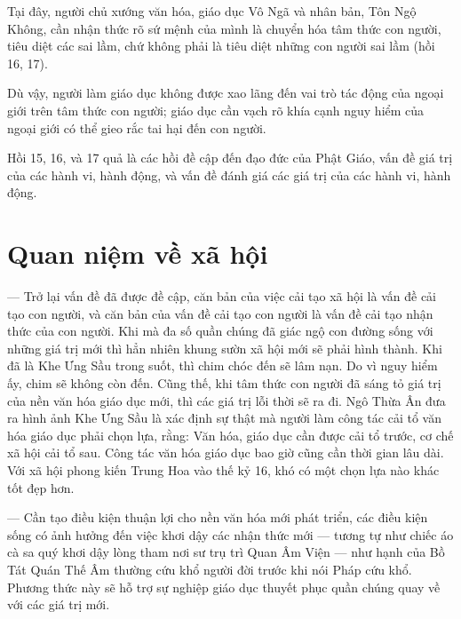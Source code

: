 Tại đây, người chủ xướng văn hóa, giáo dục Vô Ngã và nhân bản, Tôn Ngộ Không, cần nhận thức rõ sứ mệnh của mình là chuyển hóa tâm thức con người, tiêu diệt các sai lầm, chứ không phải là tiêu diệt những con người sai lầm (hồi 16, 17).

Dù vậy, người làm giáo dục không được xao lãng đến vai trò tác động của ngoại giới trên tâm thức con người; giáo dục cần vạch rõ khía cạnh nguy hiểm của ngoại giới có thể gieo rắc tai hại đến con người.

Hồi 15, 16, và 17 quả là các hồi đề cập đến đạo đức của Phật Giáo, vấn đề giá trị của các hành vi, hành động, và vấn đề đánh giá các giá trị của các hành vi, hành động.

\section{Quan niệm về xã hội} %
\label{sec:15_xa_hoi}

— Trở lại vấn đề đã được đề cập, căn bản của việc cải tạo xã hội là vấn đề cải tạo con người, và căn bản của vấn đề cải tạo con người là vấn đề cải tạo nhận thức của con người. Khi mà đa số quần chúng đã giác ngộ con đường sống với những giá trị mới thì hẳn nhiên khung sườn xã hội mới sẽ phải hình thành. Khi đã là Khe Ưng Sầu trong suốt, thì chim chóc đến sẽ lâm nạn. Do vì nguy hiểm ấy, chim sẽ không còn đến. Cũng thế, khi tâm thức con người đã sáng tỏ giá trị của nền văn hóa giáo dục mới, thì các giá trị lỗi thời sẽ ra đi. Ngô Thừa Ân đưa ra hình ảnh Khe Ưng Sầu là xác định sự thật mà người làm công tác cải tổ văn hóa giáo dục phải chọn lựa, rằng: Văn hóa, giáo dục cần được cải tổ trước, cơ chế xã hội cải tổ sau. Công tác văn hóa giáo dục bao giờ cũng cần thời gian lâu dài. Với xã hội phong kiến Trung Hoa vào thế kỷ 16, khó có một chọn lựa nào khác tốt đẹp hơn.

— Cần tạo điều kiện thuận lợi cho nền văn hóa mới phát triển, các điều kiện sống có ảnh hưởng đến việc khơi dậy các nhận thức mới — tương tự như chiếc áo cà sa quý khơi dậy lòng tham nơi sư trụ trì Quan Âm Viện — như hạnh của Bồ Tát Quán Thế Âm thường cứu khổ người đời trước khi nói Pháp cứu khổ. Phương thức này sẽ hỗ trợ sự nghiệp giáo dục thuyết phục quần chúng quay về với các giá trị mới.
